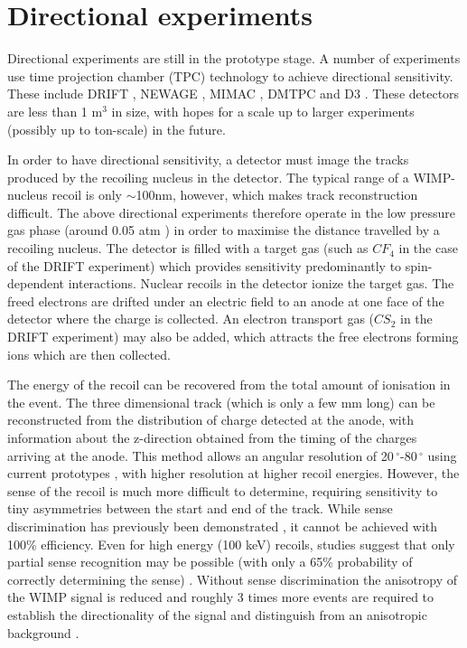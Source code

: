 \section{Directional experiments}
\label{sec:directional:experiments}

Directional experiments are still in the prototype stage. A number of experiments use time projection chamber (TPC) technology to achieve directional sensitivity. These include DRIFT \cite{Daw:2011,Daw:2012}, NEWAGE \cite{Miuchi:2010,Miuchi:2012}, MIMAC \cite{Riffard:2013, Santos:2013}, DMTPC \cite{Monroe:2012,Battat:2013} and D3 \cite{Vahsen:2012}. These detectors are less than 1 $\textrm{m}^3$ in size, with hopes for a scale up to larger experiments (possibly up to ton-scale) in the future.

In order to have directional sensitivity, a detector must image the tracks produced by the recoiling nucleus in the detector. The typical range of a WIMP-nucleus recoil is only $\sim$100nm, however, which makes track reconstruction difficult. The above directional experiments therefore operate in the low pressure gas phase (around 0.05 atm \cite{Daw:2012}) in order to maximise the distance travelled by a recoiling nucleus. The detector is filled with a target gas (such as $CF_4$ in the case of the DRIFT experiment) which provides sensitivity predominantly to spin-dependent interactions. Nuclear recoils in the detector ionize the target gas. The freed electrons are drifted under an electric field to an anode at one face of the detector where the charge is collected. An electron transport gas ($CS_2$ in the DRIFT experiment) may also be added, which attracts the free electrons forming ions which are then collected. 

The energy of the recoil can be recovered from the total amount of ionisation in the event. The three dimensional track (which is only a few mm long) can be reconstructed from the distribution of charge detected at the anode, with information about the z-direction obtained from the timing of the charges arriving at the anode. This method allows an angular resolution of 20$\,^{\circ}$-80$\,^{\circ}$ using current prototypes \cite{Billard:2012}, with higher resolution at higher recoil energies. However, the sense of the recoil is much more difficult to determine, requiring sensitivity to tiny asymmetries between the start and end of the track. While sense discrimination has previously been demonstrated \cite{Burgos:2008}, it cannot be achieved with 100\% efficiency. Even for high energy (100 keV) recoils, studies suggest that only partial sense recognition may be possible (with only a 65\% probability of correctly determining the sense) \cite{Billard:2012}. Without sense discrimination the anisotropy of the WIMP signal is reduced and roughly 3 times more events are required to establish the directionality of the signal and distinguish from an anisotropic background \cite{Morgan:2005,Green:2008}.


